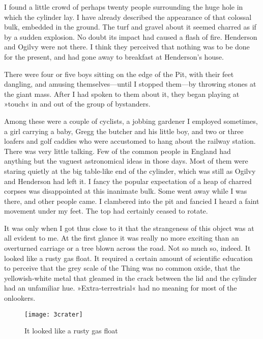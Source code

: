 

\lettrine[lines=4,findent=2pt]{I}{} found a little crowd of perhaps twenty people surrounding the huge hole in which the cylinder lay. I have already described the appearance of that colossal bulk, embedded in the ground. The turf and gravel about it seemed charred as if by a sudden explosion. No doubt its impact had caused a flash of fire. Henderson and Ogilvy were not there. I think they perceived that nothing was to be done for the present, and had gone away to breakfast at Henderson's house.

There were four or five boys sitting on the edge of the Pit, with their feet dangling, and amusing themselves—until I stopped them—by throwing stones at the giant mass. After I had spoken to them about it, they began playing at »touch« in and out of the group of bystanders.

Among these were a couple of cyclists, a jobbing gardener I employed sometimes, a girl carrying a baby, Gregg the butcher and his little boy, and two or three loafers and golf caddies who were accustomed to hang about the railway station. There was very little talking. Few of the common people in England had anything but the vaguest astronomical ideas in those days. Most of them were staring quietly at the big table-like end of the cylinder, which was still as Ogilvy and Henderson had left it. I fancy the popular expectation of a heap of charred corpses was disappointed at this inanimate bulk. Some went away while I was there, and other people came. I clambered into the pit and fancied I heard a faint movement under my feet. The top had certainly ceased to rotate.

It was only when I got thus close to it that the strangeness of this object was at all evident to me. At the first glance it was really no more exciting than an overturned carriage or a tree blown across the road. Not so much so, indeed. It looked like a rusty gas float. It required a certain amount of scientific education to perceive that the grey scale of the Thing was no common oxide, that the yellowish-white metal that gleamed in the crack between the lid and the cylinder had an unfamiliar hue. »Extra-terrestrial« had no meaning for most of the onlookers.


\begin{sidewaysfigure}
	\texttt{[image: 3crater]}
	\caption{It looked like a rusty gas float}
\end{sidewaysfigure}


